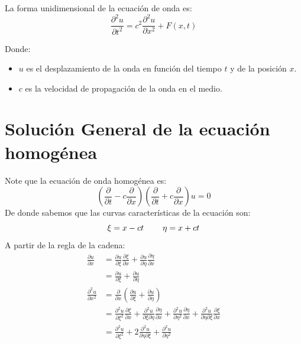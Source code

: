 \documentclass[11pt]{book}
\theoremstyle{plain}
\theoremstyle{definition}
\begin{document}
La forma unidimensional de la ecuación de onda es:
\setcounter{equation}{0}
\begin{equation}
\frac{\partial^2 u}{\partial t^2} = c^2 \frac{\partial^2 u}{\partial x^2} + F(x,t)
\end{equation}

Donde:

\begin{itemize}
    \item \( u \) es el desplazamiento de la onda en función del tiempo \( t \) y de la posición \( x \).
    \item \( c \) es la velocidad de propagación de la onda en el medio.
\end{itemize}

\section{Solución General de la ecuación homogénea}
Note que la ecuación de onda homogénea es:
\begin{equation}
(\frac{\partial}{\partial t} - c \frac{\partial}{\partial x})(\frac{\partial}{\partial t} + c \frac{\partial}{\partial x}) u = 0
\end{equation}
De donde sabemos que las curvas características de la ecuación son:
\begin{equation*}
    \xi = x-ct \hspace{8mm} \eta = x+ct
\end{equation*}
A partir de la regla de la cadena:
\begin{align*}
    \frac{\partial u}{\partial x} &=  \frac{\partial u}{\partial \xi} \frac{\partial \xi}{\partial x} + \frac{\partial u}{\partial \eta} \frac{\partial \eta}{\partial x}\\
    &= \frac{\partial u}{\partial \xi} + \frac{\partial u}{\partial \eta}\\
    \frac{\partial^{2} u}{\partial x^{2}} &=\frac{\partial}{\partial x} \left( \frac{\partial u}{\partial \xi} + \frac{\partial u}{\partial \eta} \right) \\
    &= \frac{\partial^{2} u}{\partial \xi^{2}}\frac{\partial \xi}{\partial x} + \frac{\partial^{2} u}{\partial \xi \partial \eta}\frac{\partial \eta}{\partial x} + \frac{\partial^{2} u}{\partial \eta^{2}}\frac{\partial \eta}{\partial x} + \frac{\partial^{2} u}{\partial \eta \partial \xi}\frac{\partial \xi}{\partial x}\\
    &= \frac{\partial^{2} u}{\partial \xi^{2}} + 2\frac{\partial^{2} u}{\partial \eta \partial \xi} + \frac{\partial^{2} u}{\partial \eta^{2}}
\end{align*}
\end{document}
